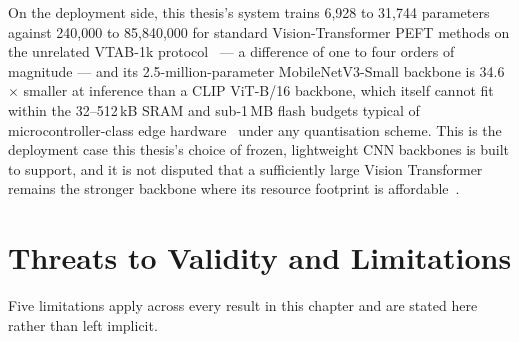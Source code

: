\documentclass{iutbscthesis}
\begin{document}
On the deployment side, this thesis's system trains 6{,}928 to 31{,}744 parameters against 240{,}000 to 85{,}840{,}000 for standard Vision-Transformer PEFT methods on the unrelated VTAB-1k protocol~\cite{lian2022ssf,jia2022vpt,zhou2022coop} — a difference of one to four orders of magnitude — and its 2.5-million-parameter MobileNetV3-Small backbone is 34.6$\times$ smaller at inference than a CLIP ViT-B/16 backbone, which itself cannot fit within the 32--512\,kB SRAM and sub-1\,MB flash budgets typical of microcontroller-class edge hardware~\cite{somvanshi2025tinydl} under any quantisation scheme. This is the deployment case this thesis's choice of frozen, lightweight CNN backbones is built to support, and it is not disputed that a sufficiently large Vision Transformer remains the stronger backbone where its resource footprint is affordable~\cite{simeoni2025dinov3}.

\section{Threats to Validity and Limitations}
\label{sec:results-limitations}

Five limitations apply across every result in this chapter and are stated here rather than left implicit.
\end{document}
